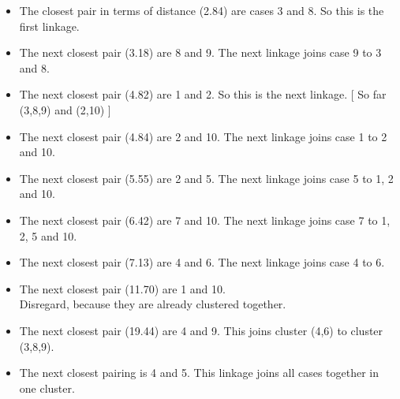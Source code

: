 \documentclass[a4paper,12pt]{report}
\begin{document}
\begin{itemize}
	\item The closest pair in terms of distance (2.84) are cases 3 and 8. So this is the first linkage.
	\item The next closest pair (3.18) are 8 and 9. The next linkage joins case 9 to 3 and 8.
	\item The next closest pair (4.82) are 1 and 2. So this is the next linkage. [ So far (3,8,9) and (2,10) ] 
	\item The next closest pair (4.84) are 2 and 10. The next linkage joins case 1 to 2 and 10.
	\item The next closest pair (5.55) are 2 and 5. The next linkage joins case 5 to 1, 2 and 10. \\ [ So far (3,8,9) and (1,2,5,10).]
	\item The next closest pair (6.42) are 7 and 10. The next linkage joins case 7 to 1, 2, 5 and 10.
	\item The next closest pair (7.13) are 4 and 6. The next linkage joins case 4 to 6. \\[ So far (3,8,9), (4,6) and (1,2,5,10) All cases are in clusters. This is a 3 cluster solution. ]
	\item The next closest pair (11.70) are 1 and 10. \\ Disregard, because they are already clustered together.
	\item The next closest pair (19.44) are 4 and 9. This joins cluster (4,6) to cluster (3,8,9).\\ [ So far (3,4,6,8,9) and (1,2,5,10). This is a 2 cluster solution.]
	\item The next closest pairing is 4 and 5. This linkage joins all cases together in one cluster.
\end{itemize}
\end{document}
